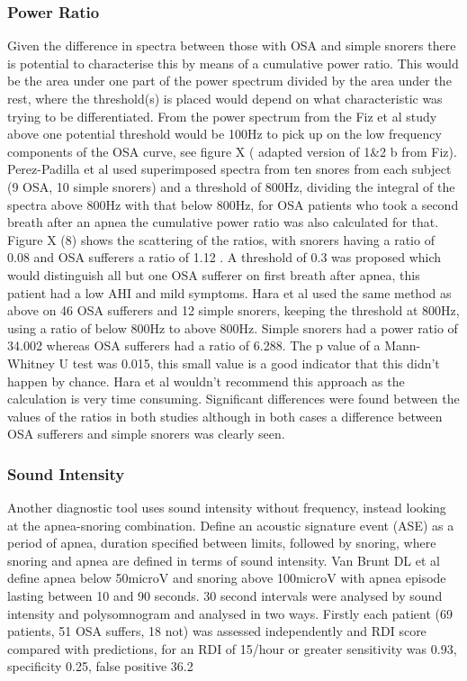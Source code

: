\subsubsection{Power Ratio}
Given the difference in spectra between those with OSA and simple snorers there is potential to characterise this by means of a cumulative power ratio. This would be the area under one part of the power spectrum divided by the area under the rest, where the threshold(s) is placed would depend on what characteristic was trying to be differentiated. From the power spectrum from the Fiz et al study above one potential threshold would be 100Hz to pick up on the low frequency components of the OSA curve, see figure X ( adapted version of 1&2 b from Fiz). 
Perez-Padilla et al used superimposed spectra from ten snores from each subject (9 OSA, 10 simple snorers) and a threshold of 800Hz, dividing the integral of the spectra above 800Hz with that below 800Hz, for OSA patients who took a second breath after an apnea the cumulative power ratio was also calculated for that. Figure X (8) shows the scattering of the ratios, with snorers having a ratio of 0.08  and OSA sufferers a ratio of 1.12 . A threshold of 0.3 was proposed which would distinguish all but one OSA sufferer on first breath after apnea, this patient had a low AHI and mild symptoms. 
Hara et al used the same method as above on 46 OSA sufferers and 12 simple snorers, keeping the threshold at 800Hz, using a ratio of below 800Hz to above 800Hz. Simple snorers had a power ratio of 34.002 whereas OSA sufferers had a ratio of 6.288. The p value of a Mann-Whitney U test was 0.015, this small value is a good indicator that this didn’t happen by chance. 
Hara et al wouldn’t recommend this approach as the calculation is very time consuming. Significant differences were found between the values of the ratios in both studies although in both cases a difference between OSA sufferers and simple snorers was clearly seen. 

\subsubsection{Sound Intensity}
Another diagnostic tool uses sound intensity without frequency, instead looking at the apnea-snoring combination. Define an acoustic signature event (ASE) as a period of apnea, duration specified between limits, followed by snoring, where snoring and apnea are defined in terms of sound intensity.
Van Brunt DL et al define apnea below 50microV and snoring above 100microV with apnea episode lasting between 10 and 90 seconds. 30 second intervals were analysed by sound intensity and polysomnogram and analysed in two ways. Firstly each patient (69 patients, 51 OSA suffers, 18 not) was assessed independently and RDI score compared with predictions, for an RDI of 15/hour or greater sensitivity was 0.93, specificity 0.25, false positive 36.2%

